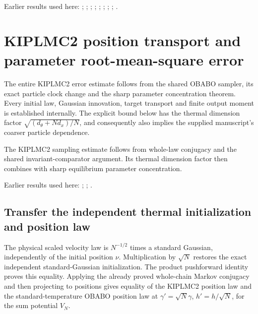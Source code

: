 \documentclass[11pt,a4paper]{report}
\begin{document}
Earlier results used here: \cite[Section~3.26.3]{LangevinLean2026ULASC}; \cite[Section~3.1.1]{LangevinLean2026IPLA}; \cite[Section~3.1.4]{LangevinLean2026IPLA}; \cite[Section~3.3.2]{LangevinLean2026IPLA}; \cite[Section~3.5.1]{LangevinLean2026IPLA}; \cite[Section~3.113.3]{LangevinLean2026Kinetic}; \cite[Section~3.20.1]{LangevinLean2026Kinetic}; \cite[Section~3.20.5]{LangevinLean2026Kinetic}; \cite[Section~3.51.2]{LangevinLean2026Kinetic}.
\section{\texorpdfstring{KIPLMC2 position transport and parameter root-mean-square error}{KIPLMC2 position transport and parameter root-mean-square error}}
\label{proof-module-KIPLMC-OBABOBound-lean}


The entire KIPLMC2 error estimate follows from the shared OBABO sampler, its exact particle clock change and the sharp parameter concentration theorem. Every initial law, Gaussian innovation, target transport and finite output moment is established internally. The explicit bound below has the thermal dimension factor \(\sqrt{(d_\theta+Nd_x)/N}\), and consequently also implies the supplied manuscript’s coarser particle dependence.



The KIPLMC2 sampling estimate follows from whole-law conjugacy and the shared invariant-comparator argument. Its thermal dimension factor then combines with sharp equilibrium parameter concentration.



Earlier results used here: \cite[Section~3.118]{LangevinLean2026Kinetic}; \cite[Section~3.122]{LangevinLean2026Kinetic}; \cite[Section~3.123]{LangevinLean2026Kinetic}.
\subsection{\texorpdfstring{Transfer the independent thermal initialization and position law}{Transfer the independent thermal initialization and position law}}
\label{report-step-KIPLMC-OBABOBound-lean-1}


The physical scaled velocity law is \(N^{-1/2}\) times a standard Gaussian, independently of the initial position \(\nu\). Multiplication by \(\sqrt N\) restores the exact independent standard-Gaussian initialization. The product pushforward identity proves this equality. Applying the already proved whole-chain Markov conjugacy and then projecting to positions gives equality of the KIPLMC2 position law and the standard-temperature OBABO position law at \(\gamma\prime=\sqrt N\gamma\), \(h\prime=h/\sqrt N\), for the sum potential \(V_N\).
\end{document}
